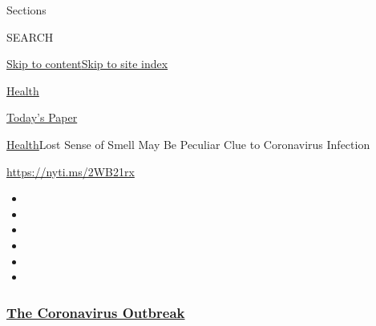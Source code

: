 Sections

SEARCH

\protect\hyperlink{site-content}{Skip to
content}\protect\hyperlink{site-index}{Skip to site index}

\href{https://www.nytimes3xbfgragh.onion/section/health}{Health}

\href{https://myaccount.nytimes3xbfgragh.onion/auth/login?response_type=cookie\&client_id=vi}{}

\href{https://www.nytimes3xbfgragh.onion/section/todayspaper}{Today's
Paper}

\href{/section/health}{Health}\textbar{}Lost Sense of Smell May Be
Peculiar Clue to Coronavirus Infection

\url{https://nyti.ms/2WB21rx}

\begin{itemize}
\item
\item
\item
\item
\item
\item
\end{itemize}

\hypertarget{the-coronavirus-outbreak}{%
\subsubsection{\texorpdfstring{\href{https://www.nytimes3xbfgragh.onion/news-event/coronavirus?name=styln-coronavirus-national\&region=TOP_BANNER\&block=storyline_menu_recirc\&action=click\&pgtype=Article\&impression_id=52f561b0-efba-11ea-bed1-593c78fad5c8\&variant=undefined}{The
Coronavirus
Outbreak}}{The Coronavirus Outbreak}}\label{the-coronavirus-outbreak}}

